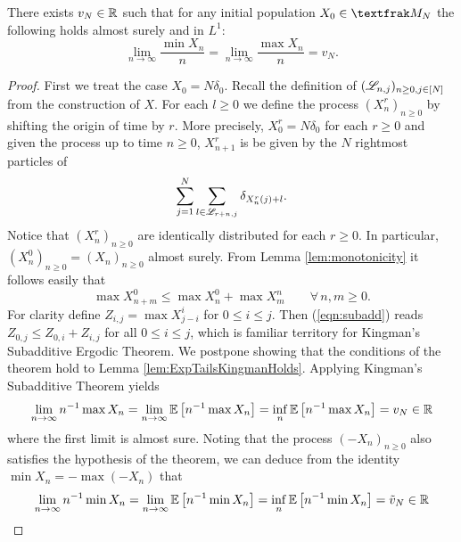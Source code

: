 \begin{proposition}\label{prop:ExpTailsSpeedExistence}
There exists $v_N \in \mathbb{R}$ such that for any initial population $X_0 \in \frak{M}_N$ the following holds almost surely and in $L^1$:
\begin{equation}\nonumber
\lim\limits_{n \to \infty} \frac{\min X_n}{n} = \lim\limits_{n \to \infty} \frac{\max X_n}{n} = v_N. 
\end{equation}
\end{proposition}

\begin{proof}
First we treat the case $X_0 = N \delta_0$. Recall the definition of $(\mathscr{L}_{n, j})_{n \geq 0, j \in [N]}$ from the construction of $X$. For each $l \geq 0$ we define the process $(X^r_n)_{n \geq 0}$ by shifting the origin of time by $r$. More precisely, $X^r_0 = N \delta_0$ for each $r \geq 0$ and given the process up to time $n \geq 0$, $X^r_{n+1}$ is be given by the $N$ rightmost particles of 
\begin{equation}\nonumber
\sum_{j = 1}^N \sum_{l \in \mathscr{L}_{r + n, j}} \delta_{X^r_n(j) + l}. 
\end{equation}
Notice that $(X^r_n)_{n \geq 0}$ are identically distributed for each $r \geq 0$. In particular, $(X^0_n)_{n \geq 0} = (X_n)_{n \geq 0}$ almost surely. From Lemma \ref{lem:monotonicity} it follows easily that 
\begin{equation}\label{eqn:subadd}
\max X^0_{n + m} \leq \max X^0_n + \max X^n_m \qquad \forall\, n,m \geq 0. 
\end{equation}
For clarity define $Z_{i,j} = \max X^i_{j - i}$ for $0 \leq i \leq j$. Then (\ref{eqn:subadd}) reads $Z_{0, j} \leq Z_{0,i} + Z_{i,j}$ for all $0 \leq i \leq j$, which is familiar territory for Kingman's Subadditive Ergodic Theorem. We postpone showing that the conditions of the theorem hold to Lemma \ref{lem:ExpTailsKingmanHolds}. Applying Kingman's Subadditive Theorem yields 
\begin{equation}\nonumber
\lim_{n \to \infty} n^{-1} \max X_n = \lim_{n \to \infty} \mathbb{E}\left[ n^{-1} \max X_n \right] = \inf_n \mathbb{E}\left[ n^{-1} \max X_n \right] = v_N \in \mathbb{R}
\end{equation}
where the first limit is almost sure. Noting that the process $(-X_n)_{n \geq 0}$ also satisfies the hypothesis of the theorem, we can deduce from the identity $\min X_n = - \max (-X_n)$ that 
\begin{equation}\nonumber
\lim_{n \to \infty} n^{-1} \min X_n = \lim_{n \to \infty} \Ex{n^{-1} \min X_n} = \inf_n \Ex{n^{-1} \min X_n} = \tilde{v}_N \in \R

\end{equation}
\end{proof}
